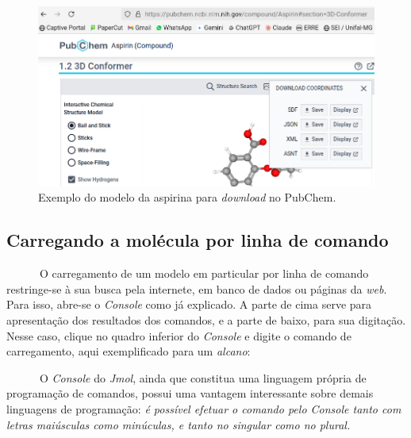\documentclass[
  letterpaper,
  DIV=11,
  numbers=noendperiod]{scrreprt}
\newenvironment{Shaded}{\begin{snugshade}}{\end{snugshade}}
\newcommand{\NormalTok}[1]{\textcolor[rgb]{0.00,0.23,0.31}{#1}}
\newcommand{\SpecialCharTok}[1]{\textcolor[rgb]{0.37,0.37,0.37}{#1}}
\begin{document}
\begin{figure}[H]

{\centering \includegraphics{aspirin.png}

}

\caption{Exemplo do modelo da aspirina para \emph{download} no PubChem.}

\end{figure}%

\subsection{Carregando a molécula por linha de
comando}\label{carregando-a-moluxe9cula-por-linha-de-comando}

~~~~~~O carregamento de um modelo em particular por linha de comando
restringe-se à sua busca pela internete, em banco de dados ou páginas da
\emph{web}. Para isso, abre-se o \emph{Console} como já explicado. A
parte de cima serve para apresentação dos resultados dos comandos, e a
parte de baixo, para sua digitação. Nesse caso, clique no quadro
inferior do \emph{Console} e digite o comando de carregamento, aqui
exemplificado para um \emph{alcano}:

\begin{Shaded}
\end{Shaded}

~~~~~~O \emph{Console} do \emph{Jmol}, ainda que constitua uma linguagem
própria de programação de comandos, possui uma vantagem interessante
sobre demais linguagens de programação: \emph{é possível efetuar o
comando pelo Console tanto com letras maiúsculas como minúculas, e tanto
no singular como no plural.}
\end{document}
